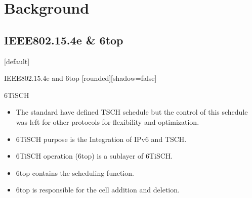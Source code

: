 \documentclass{beamer}
\makeatletter
\newenvironment{withoutheadline}{
        \setbeamertemplate{headline}[default]
        \def\beamer@entrycode{\vspace*{-\headheight}}
    }{}
\makeatother
\begin{document}


\section{Background}
\subsection{IEEE802.15.4e \& 6top}
\begin{withoutheadline}
\begin{frame}{IEEE802.15.4e and 6top}
[rounded][shadow=false]




\begin{block}{6TiSCH}
    \begin{itemize}
    \item The standard have defined TSCH schedule but the control of this schedule  was left for other protocols for flexibility and optimization.
    \item<2-> 6TiSCH purpose is the Integration of IPv6 and TSCH. 
    \item<3-> 6TiSCH operation (6top) is a sublayer of 6TiSCH.
    \item<4-> 6top contains the scheduling function. 
    \item<5> 6top is responsible for the cell addition and deletion. 
    
    \end{itemize}
    \end{block}
\end{frame}
\end{withoutheadline}
\end{document}
